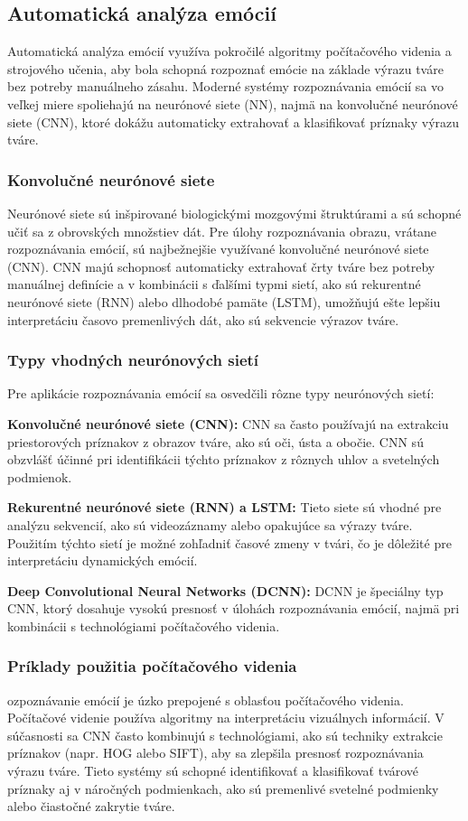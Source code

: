 \subsection{Automatická analýza emócií}
Automatická analýza emócií využíva pokročilé algoritmy počítačového videnia a strojového učenia, aby bola schopná rozpoznať emócie na základe výrazu tváre bez potreby manuálneho zásahu. Moderné systémy rozpoznávania emócií sa vo veľkej miere spoliehajú na neurónové siete (NN), najmä na konvolučné neurónové siete (CNN), ktoré dokážu automaticky extrahovať a klasifikovať príznaky výrazu tváre.
\subsubsection{Konvolučné neurónové siete}
Neurónové siete sú inšpirované biologickými mozgovými štruktúrami a sú schopné učiť sa z obrovských množstiev dát. Pre úlohy rozpoznávania obrazu, vrátane rozpoznávania emócií, sú najbežnejšie využívané konvolučné neurónové siete (CNN)​. CNN majú schopnosť automaticky extrahovať črty tváre bez potreby manuálnej definície a v kombinácii s ďalšími typmi sietí, ako sú rekurentné neurónové siete (RNN) alebo dlhodobé pamäte (LSTM), umožňujú ešte lepšiu interpretáciu časovo premenlivých dát, ako sú sekvencie výrazov tváre. \cite{CANAL2022593} \cite{roy2024resemotenetbridgingaccuracyloss}
\subsubsection{Typy vhodných neurónových sietí}
Pre aplikácie rozpoznávania emócií sa osvedčili rôzne typy neurónových sietí:

\textbf{Konvolučné neurónové siete (CNN):} CNN sa často používajú na extrakciu priestorových príznakov z obrazov tváre, ako sú oči, ústa a obočie​. CNN sú obzvlášť účinné pri identifikácii týchto príznakov z rôznych uhlov a svetelných podmienok. \cite{electronics12173595}

\textbf{Rekurentné neurónové siete (RNN) a LSTM: }Tieto siete sú vhodné pre analýzu sekvencií, ako sú videozáznamy alebo opakujúce sa výrazy tváre. Použitím týchto sietí je možné zohľadniť časové zmeny v tvári, čo je dôležité pre interpretáciu dynamických emócií​. \cite{s18020401}

\textbf{Deep Convolutional Neural Networks (DCNN): } DCNN je špeciálny typ CNN, ktorý dosahuje vysokú presnosť v úlohách rozpoznávania emócií, najmä pri kombinácii s technológiami počítačového videnia.
\subsubsection{Príklady použitia počítačového videnia}
ozpoznávanie emócií je úzko prepojené s oblasťou počítačového videnia. Počítačové videnie používa algoritmy na interpretáciu vizuálnych informácií. V súčasnosti sa CNN často kombinujú s technológiami, ako sú techniky extrakcie príznakov (napr. HOG alebo SIFT), aby sa zlepšila presnosť rozpoznávania výrazu tváre. Tieto systémy sú schopné identifikovať a klasifikovať tvárové príznaky aj v náročných podmienkach, ako sú premenlivé svetelné podmienky alebo čiastočné zakrytie tváre.\cite{Huang2023}



